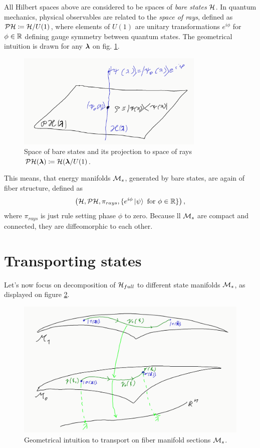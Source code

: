 All Hilbert spaces above are considered to be spaces of \emph{bare states} $\mathcal{H}$. In quantum mechanics, physical observables are related to the \emph{space of rays}, defined as $\mathcal{P}\mathcal{H}\coloneqq \mathcal{H}/U(1)$, where elements of $U(1)$ are unitary transformations $e^{i\phi}$ for $\phi\in\mathbb{R}$ defining gauge symmetry between quantum states. The geometrical intuition is drawn for any ${\bm\lambda}$ on fig. \ref{fig:projectiveHilbertSpace}.
\begin{figure}[h]
    \centering
    \includegraphics[width=0.8\textwidth]{../img/projectiveHilbertSpace.png}
\caption{Space of bare states and its projection to space of rays $\mathcal{P}\mathcal{H}({\bm\lambda})\coloneqq \mathcal{H}({\bm\lambda}/U(1)$.}
    \label{fig:projectiveHilbertSpace}
\end{figure}

This means, that energy manifolds $\mathcal{M}_s$, generated by bare states, are again of fiber structure, defined as
$$\left(\mathcal{H},\mathcal{P}\mathcal{H},\pi_{rays},\{e^{i\phi}\ket{\psi} \text{ for }\phi\in\mathbb{R}\}\right),$$
where $\pi_{rays}$ is just rule setting phase $\phi$ to zero. Because ll $\mathcal{M}_s$ are compact and connected, they are diffeomorphic to each other.


\section{Transporting states}
Let's now focus on decomposition of $\mathcal{H}_{full}$ to different state manifolds $\mathcal{M}_s$, as displayed on figure \ref{fig:manifoldCutIntuition}.

\begin{figure}[h]
    \centering
    \includegraphics[width=\textwidth]{../img/manifoldCutIntuition.png}
\caption{Geometrical intuition to transport on fiber manifold sections $\mathcal{M}_s$.}
    \label{fig:manifoldCutIntuition}
\end{figure}

